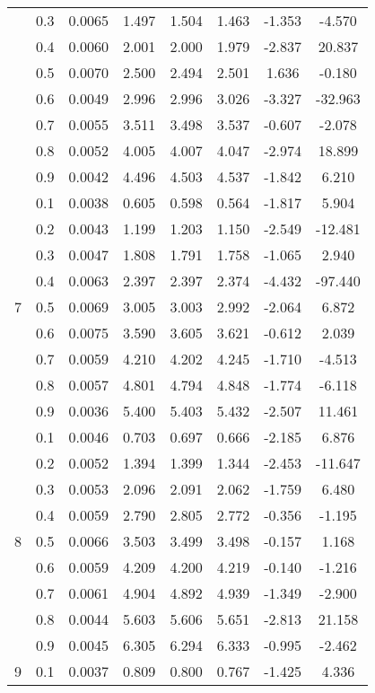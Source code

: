 \documentclass[11pt,a4paper]{report}
\begin{document}
\begin{longtable}{ | c | c || c | c | c | c | c | c | }
 & 0.3 & 0.0065 & 1.497 & 1.504 & 1.463 & -1.353 & -4.570 \\
 & 0.4 & 0.0060 & 2.001 & 2.000 & 1.979 & -2.837 & 20.837 \\
 & 0.5 & 0.0070 & 2.500 & 2.494 & 2.501 & 1.636 & -0.180 \\
 & 0.6 & 0.0049 & 2.996 & 2.996 & 3.026 & -3.327 & -32.963 \\
 & 0.7 & 0.0055 & 3.511 & 3.498 & 3.537 & -0.607 & -2.078 \\
 & 0.8 & 0.0052 & 4.005 & 4.007 & 4.047 & -2.974 & 18.899 \\
 & 0.9 & 0.0042 & 4.496 & 4.503 & 4.537 & -1.842 & 6.210 \\
 \hline
\multirow{9}{*}{7} & 0.1 & 0.0038 & 0.605 & 0.598 & 0.564 & -1.817 & 5.904 \\
 & 0.2 & 0.0043 & 1.199 & 1.203 & 1.150 & -2.549 & -12.481 \\
 & 0.3 & 0.0047 & 1.808 & 1.791 & 1.758 & -1.065 & 2.940 \\
 & 0.4 & 0.0063 & 2.397 & 2.397 & 2.374 & -4.432 & -97.440 \\
 & 0.5 & 0.0069 & 3.005 & 3.003 & 2.992 & -2.064 & 6.872 \\
 & 0.6 & 0.0075 & 3.590 & 3.605 & 3.621 & -0.612 & 2.039 \\
 & 0.7 & 0.0059 & 4.210 & 4.202 & 4.245 & -1.710 & -4.513 \\
 & 0.8 & 0.0057 & 4.801 & 4.794 & 4.848 & -1.774 & -6.118 \\
 & 0.9 & 0.0036 & 5.400 & 5.403 & 5.432 & -2.507 & 11.461 \\
 \hline
\multirow{9}{*}{8} & 0.1 & 0.0046 & 0.703 & 0.697 & 0.666 & -2.185 & 6.876 \\
 & 0.2 & 0.0052 & 1.394 & 1.399 & 1.344 & -2.453 & -11.647 \\
 & 0.3 & 0.0053 & 2.096 & 2.091 & 2.062 & -1.759 & 6.480 \\
 & 0.4 & 0.0059 & 2.790 & 2.805 & 2.772 & -0.356 & -1.195 \\
 & 0.5 & 0.0066 & 3.503 & 3.499 & 3.498 & -0.157 & 1.168 \\
 & 0.6 & 0.0059 & 4.209 & 4.200 & 4.219 & -0.140 & -1.216 \\
 & 0.7 & 0.0061 & 4.904 & 4.892 & 4.939 & -1.349 & -2.900 \\
 & 0.8 & 0.0044 & 5.603 & 5.606 & 5.651 & -2.813 & 21.158 \\
 & 0.9 & 0.0045 & 6.305 & 6.294 & 6.333 & -0.995 & -2.462 \\
 \hline
\multirow{9}{*}{9} & 0.1 & 0.0037 & 0.809 & 0.800 & 0.767 & -1.425 & 4.336 \\

\end{longtable}
\end{document}
